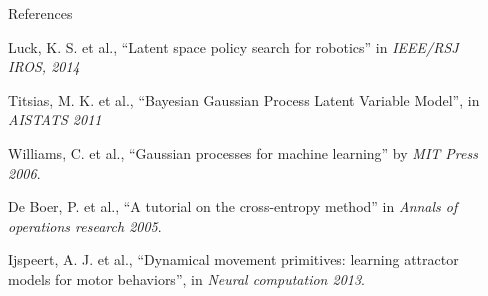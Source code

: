 \documentclass[final,hyperref={pdfpagelabels=false}]{beamer}
\begin{document}
\begin{frame}[t]
\begin{columns}[t]
\begin{column}{0.47\textwidth}
\begin{block}{References}
{\begin{thebibliography}{10}
        Luck, K. S. et al., ``Latent space policy search for robotics'' in \emph{IEEE/RSJ IROS, 2014}

        Titsias, M. K. et al., ``Bayesian Gaussian Process Latent Variable Model'', in \emph{AISTATS 2011}

        Williams, C. et al., ``Gaussian processes for machine learning'' by \emph{MIT Press 2006}.

        De Boer, P. et al., ``A tutorial on the cross-entropy method'' in \emph{Annals of operations research 2005}.

        Ijspeert, A. J. et al., ``Dynamical movement primitives: learning attractor models for motor behaviors'', in \emph{Neural computation 2013}.
      \end{thebibliography}}
    \end{block}
  \end{column}

  \begin{column}{.02\textwidth}\end{column}
\end{columns}

\end{frame}
\end{document}
